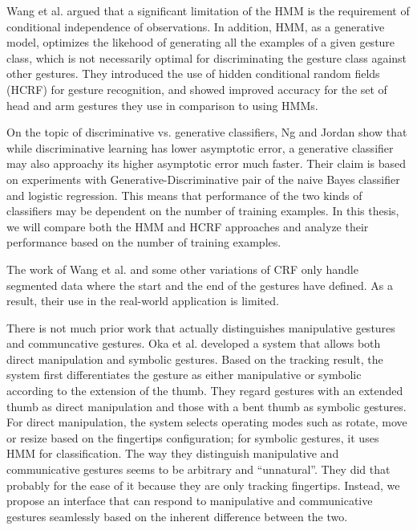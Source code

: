 Wang et al. \cite{wang06} argued that a significant limitation of the
HMM is the requirement of conditional independence of observations. In
addition, HMM, as a generative model, optimizes the likehood of
generating all the examples of a given gesture class, which is not
necessarily optimal for discriminating the gesture class against other
gestures. They introduced the use of hidden conditional random fields (HCRF) for
gesture recognition, and showed improved accuracy for the set of head and
arm gestures they use in comparison to using HMMs. 

On the topic of discriminative vs. generative classifiers, Ng and Jordan
\cite{ng02} show that while discriminative learning has lower asymptotic error,
a generative classifier may also approachy its higher asymptotic error much
faster. Their claim is based on experiments with Generative-Discriminative
pair of the naive Bayes classifier and logistic regression. This means that
performance of the two kinds of classifiers may be dependent on the number of training
examples. In this thesis, we will compare both the HMM and HCRF approaches and
analyze their performance based on the number of training examples.

The work of Wang et al. and some other variations of CRF only handle segmented
data where the start and the end of the gestures have defined. As a result,
their use in the real-world application is limited.

\cite{song12}

There is not much prior work that actually distinguishes manipulative gestures
and communcative gestures. Oka et al. \cite{Oka02} developed a system that allows
both direct manipulation and symbolic gestures. Based on the tracking result,
the system first differentiates the gesture as either manipulative or symbolic 
according to the extension of the thumb. They regard gestures with an extended 
thumb as direct manipulation and those with a bent thumb as symbolic gestures. 
For direct manipulation, the system selects operating modes such as rotate, 
move or resize based on the fingertips configuration; for symbolic gestures, it 
uses HMM for classification. The way they distinguish manipulative and 
communicative gestures seems to be arbitrary and ``unnatural''. They did that 
probably for the ease of it because they are only tracking fingertips.
Instead, we propose an interface that can respond to manipulative and
communicative gestures seamlessly based on the inherent difference between the two.

